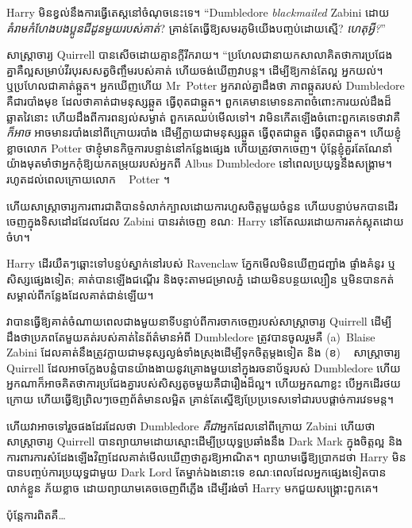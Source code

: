 Harry មិនខ្វល់នឹងការធ្វើតេស្តនៅចំណុចនេះទេ។ “Dumbledore \emph{blackmailed} Zabini ដោយ\emph{គំរាមកំហែងបងប្អូនជីដូនមួយរបស់គាត់}? គ្រាន់តែ​ធ្វើ​ឱ្យ​សមរភូមិ​យើង​បញ្ចប់​ដោយ​ស្មើ? \emph{ហេតុអ្វី?}”

សាស្ត្រាចារ្យ Quirrell បានសើចដោយគ្មានក្តីរីករាយ។ “ប្រហែលជានាយកសាលាគិតថាការប្រជែងគ្នាគឺល្អសម្រាប់វីរបុរសសត្វចិញ្ចឹមរបស់គាត់ ហើយចង់ឃើញវាបន្ត។ ដើម្បីឱ្យកាន់តែល្អ អ្នកយល់។ ឬប្រហែលជាគាត់ឆ្កួត។ អ្នកឃើញហើយ Mr~Potter អ្នករាល់គ្នាដឹងថា ភាពឆ្កួតរបស់ Dumbledore គឺជារបាំងមុខ ដែលថាគាត់ជាមនុស្សឆ្កួត ធ្វើពុតជាឆ្កួត។ ពួកគេ​មាន​មោទនភាព​ចំពោះ​ការ​យល់​ដឹង​ដ៏​ឆ្លាត​វៃ​នោះ ហើយ​ដឹង​ពី​ការ​ពន្យល់​សម្ងាត់ ពួកគេ​ឈប់​មើល​ទៅ។ វាមិនកើតឡើងចំពោះពួកគេទេថាវាគឺ \emph{ក៏អាច} អាចមានរបាំងនៅពីក្រោយរបាំង ដើម្បីក្លាយជាមនុស្សឆ្កួត ធ្វើពុតជាឆ្កួត ធ្វើពុតជាឆ្កួត។ ហើយខ្ញុំខ្លាចលោក Potter ថាខ្ញុំមានកិច្ចការបន្ទាន់នៅកន្លែងផ្សេង ហើយត្រូវចាកចេញ។ ប៉ុន្តែខ្ញុំគួរតែណែនាំយ៉ាងមុតមាំថាអ្នកកុំឱ្យយកតម្រុយរបស់អ្នកពី Albus Dumbledore នៅពេលប្រយុទ្ធនឹងសង្រ្គាម។ រហូត​ដល់​ពេល​ក្រោយ​លោក ~ Potter ។

ហើយ​សាស្ត្រាចារ្យ​ការពារ​ជាតិ​បាន​ទំលាក់​ក្បាល​ដោយ​ការ​ហួសចិត្ត​មួយ​ចំនួន ហើយ​បន្ទាប់​មក​បាន​ដើរ​ចេញ​ក្នុង​ទិស​ដៅ​ដដែល​ដែល Zabini បាន​រត់​ចេញ ខណៈ Harry នៅតែ​ឈរ​ដោយ​ការ​តក់ស្លុត​ដោយ​ចំហ។


Harry ដើរយឺតៗឆ្ពោះទៅបន្ទប់ស្នាក់នៅរបស់ Ravenclaw ភ្នែកមើលមិនឃើញជញ្ជាំង ផ្ទាំងគំនូរ ឬសិស្សផ្សេងទៀត; គាត់​បាន​ឡើង​ជណ្តើរ និង​ចុះ​តាម​ជម្រាល​ភ្នំ ដោយ​មិន​បន្ថយ​ល្បឿន ឬ​មិន​បាន​កត់​សម្គាល់​ពី​កន្លែង​ដែល​គាត់​ជាន់​ឡើយ។

វាបានធ្វើឱ្យគាត់ចំណាយពេលជាងមួយនាទីបន្ទាប់ពីការចាកចេញរបស់សាស្រ្តាចារ្យ Quirrell ដើម្បីដឹងថាប្រភពតែមួយគត់របស់គាត់នៃព័ត៌មានអំពី Dumbledore ត្រូវបានចូលរួមគឺ (a)~Blaise Zabini ដែលគាត់នឹងត្រូវក្លាយជាមនុស្សល្ងង់ទាំងស្រុងដើម្បីទុកចិត្តម្តងទៀត និង (ខ) ~ សាស្រ្តាចារ្យ Quirrell ដែលអាចក្លែងបន្លំបានយ៉ាងងាយនូវគ្រោងមួយនៅក្នុងរចនាប័ទ្មរបស់ Dumbledore ហើយអ្នកណាក៏អាចគិតថាការប្រជែងគ្នារបស់សិស្សតូចមួយគឺជារឿងដ៏ល្អ។ ហើយអ្នកណាខ្លះ បើអ្នកដើរថយក្រោយ ហើយធ្វើឱ្យព្រិលៗចេញព័ត៌មានលម្អិត គ្រាន់តែស្នើឱ្យប្រែប្រទេសទៅជារបបផ្តាច់ការវេទមន្ត។

ហើយវាអាចទៅរួចផងដែរដែលថា Dumbledore \emph{គឺជា}អ្នកដែលនៅពីក្រោយ Zabini ហើយថាសាស្រ្តាចារ្យ Quirrell បានព្យាយាមដោយស្មោះដើម្បីប្រយុទ្ធប្រឆាំងនឹង Dark Mark ក្នុងចិត្តល្អ និងការពារការសំដែងឡើងវិញដែលគាត់មើលឃើញថាគួរឱ្យអាណិត។ ព្យាយាមធ្វើឱ្យប្រាកដថា Harry មិនបានបញ្ចប់ការប្រយុទ្ធជាមួយ Dark Lord តែម្នាក់ឯងនោះទេ ខណៈពេលដែលអ្នកផ្សេងទៀតបានលាក់ខ្លួន ភ័យខ្លាច ដោយព្យាយាមគេចចេញពីភ្លើង ដើម្បីរង់ចាំ Harry មកជួយសង្គ្រោះពួកគេ។

ប៉ុន្តែការពិតគឺ…

